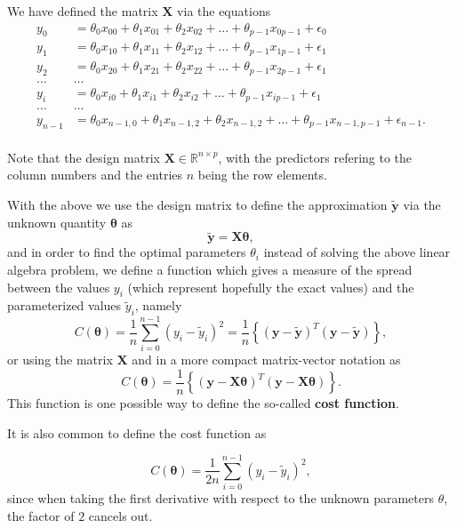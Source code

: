 \documentclass[%
oneside,                 %
final,                   %
10pt]{article}
\newenvironment{block_mdfboxadmon}[1][]{
\begin{block_mdfboxmdframed}[frametitle=#1]
}
{
\end{block_mdfboxmdframed}
}
\begin{document}

\begin{block_mdfboxadmon}[]
We have defined the matrix $\bm{X}$ via the equations
\begin{align*}
y_0&=\theta_0x_{00}+\theta_1x_{01}+\theta_2x_{02}+\dots+\theta_{p-1}x_{0p-1}+\epsilon_0\\
y_1&=\theta_0x_{10}+\theta_1x_{11}+\theta_2x_{12}+\dots+\theta_{p-1}x_{1p-1}+\epsilon_1\\
y_2&=\theta_0x_{20}+\theta_1x_{21}+\theta_2x_{22}+\dots+\theta_{p-1}x_{2p-1}+\epsilon_1\\
\dots & \dots \\
y_{i}&=\theta_0x_{i0}+\theta_1x_{i1}+\theta_2x_{i2}+\dots+\theta_{p-1}x_{ip-1}+\epsilon_1\\
\dots & \dots \\
y_{n-1}&=\theta_0x_{n-1,0}+\theta_1x_{n-1,2}+\theta_2x_{n-1,2}+\dots+\theta_{p-1}x_{n-1,p-1}+\epsilon_{n-1}.\\
\end{align*}

Note that the design matrix 
 $\bm{X}\in {\mathbb{R}}^{n\times p}$, with the predictors refering to the column numbers and the entries $n$ being the row elements.
\end{block_mdfboxadmon} %






\begin{block_mdfboxadmon}[]
With the above we use the design matrix to define the approximation $\bm{\tilde{y}}$ via the unknown quantity $\bm{\theta}$ as
\[
\bm{\tilde{y}}= \bm{X}\bm{\theta},
\]
and in order to find the optimal parameters $\theta_i$ instead of solving the above linear algebra problem, we define a function which gives a measure of the spread between the values $y_i$ (which represent hopefully the exact values) and the parameterized values $\tilde{y}_i$, namely
\[
C(\bm{\theta})=\frac{1}{n}\sum_{i=0}^{n-1}\left(y_i-\tilde{y}_i\right)^2=\frac{1}{n}\left\{\left(\bm{y}-\bm{\tilde{y}}\right)^T\left(\bm{y}-\bm{\tilde{y}}\right)\right\},
\]
or using the matrix $\bm{X}$ and in a more compact matrix-vector notation as
\[
C(\bm{\theta})=\frac{1}{n}\left\{\left(\bm{y}-\bm{X}\bm{\theta}\right)^T\left(\bm{y}-\bm{X}\bm{\theta}\right)\right\}.
\]
This function is one possible way to define the so-called \textbf{cost function}.



It is also common to define
the cost function as

\[
C(\bm{\theta})=\frac{1}{2n}\sum_{i=0}^{n-1}\left(y_i-\tilde{y}_i\right)^2,
\]
since when taking the first derivative with respect to the unknown parameters $\theta$, the factor of $2$ cancels out.
\end{block_mdfboxadmon} %
\end{document}
